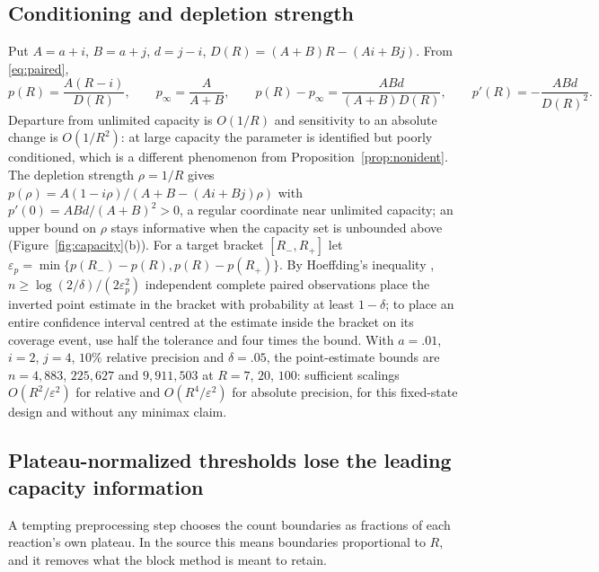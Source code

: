 \documentclass[11pt,a4paper]{article}
\theoremstyle{plain}
\theoremstyle{definition}
\theoremstyle{remark}
\newcommand{\eps}{\varepsilon}
\begin{document}
\subsection{Conditioning and depletion strength}
Put $A=a+i$, $B=a+j$, $d=j-i$, $D(R)=(A+B)R-(Ai+Bj)$. From \eqref{eq:paired},
\begin{equation}\label{eq:conditioning}
p(R)=\frac{A(R-i)}{D(R)},\qquad p_\infty=\frac A{A+B},\qquad p(R)-p_\infty=\frac{ABd}{(A+B)D(R)},\qquad p'(R)=-\frac{ABd}{D(R)^2}.
\end{equation}
Departure from unlimited capacity is $O(1/R)$ and sensitivity to an absolute change is $O(1/R^2)$: at large capacity the parameter is identified but poorly conditioned, which is a different phenomenon from Proposition~\ref{prop:nonident}. The depletion strength $\rho=1/R$ gives $p(\rho)=A(1-i\rho)/(A+B-(Ai+Bj)\rho)$ with $p'(0)=ABd/(A+B)^2>0$, a regular coordinate near unlimited capacity; an upper bound on $\rho$ stays informative when the capacity set is unbounded above (Figure~\ref{fig:capacity}(b)). For a target bracket $[R_-,R_+]$ let $\eps_p=\min\{p(R_-)-p(R),p(R)-p(R_+)\}$. By Hoeffding's inequality \citep{hoeffding1963}, $n\ge\log(2/\delta)/(2\eps_p^2)$ independent complete paired observations place the inverted point estimate in the bracket with probability at least $1-\delta$; to place an entire confidence interval centred at the estimate inside the bracket on its coverage event, use half the tolerance and four times the bound. With $a=.01$, $i=2$, $j=4$, $10\%$ relative precision and $\delta=.05$, the point-estimate bounds are $n=4{,}883$, $225{,}627$ and $9{,}911{,}503$ at $R=7$, $20$, $100$: sufficient scalings $O(R^2/\eps^2)$ for relative and $O(R^4/\eps^2)$ for absolute precision, for this fixed-state design and without any minimax claim.

\subsection{Plateau-normalized thresholds lose the leading capacity information}
A tempting preprocessing step chooses the count boundaries as fractions of each reaction's own plateau. In the source this means boundaries proportional to $R$, and it removes what the block method is meant to retain.
\end{document}
